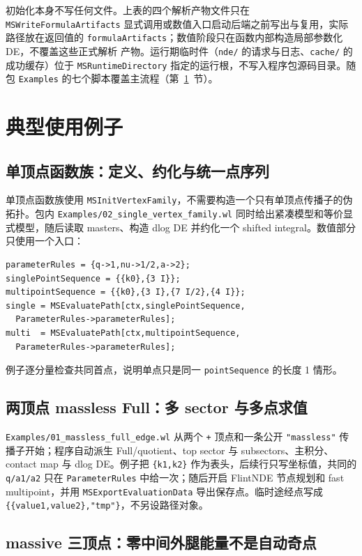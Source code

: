 \documentclass[11pt,a4paper]{ctexart}
\begin{document}
初始化本身不写任何文件。上表的四个解析产物文件只在 \texttt{MSWriteFormulaArtifacts}
显式调用或数值入口启动后端之前写出与复用，实际路径放在返回值的
\texttt{formulaArtifacts}；数值阶段只在函数内部构造局部参数化 DE，不覆盖这些正式解析
产物。运行期临时件（\texttt{nde/} 的请求与日志、\texttt{cache/} 的成功缓存）位于
\texttt{MSRuntimeDirectory} 指定的运行根，不写入程序包源码目录。随包 \texttt{Examples}
的七个脚本覆盖主流程（第~\ref{sec:handbook-examples}~节）。

\section{典型使用例子}
\label{sec:handbook-examples}

\subsection{单顶点函数族：定义、约化与统一点序列}

单顶点函数族使用 \texttt{MSInitVertexFamily}，不需要构造一个只有单顶点传播子的伪拓扑。包内
\texttt{Examples/02\_single\_vertex\_family.wl} 同时给出紧凑模型和等价显式模型，随后读取
masters、构造 dlog DE 并约化一个 shifted integral。数值部分只使用一个入口：
\begin{verbatim}
parameterRules = {q->1,nu->1/2,a->2};
singlePointSequence = {{k0},{3 I}};
multipointSequence = {{k0},{3 I},{7 I/2},{4 I}};
single = MSEvaluatePath[ctx,singlePointSequence,
  ParameterRules->parameterRules];
multi  = MSEvaluatePath[ctx,multipointSequence,
  ParameterRules->parameterRules];
\end{verbatim}
例子逐分量检查共同首点，说明单点只是同一 \texttt{pointSequence} 的长度 1 情形。

\subsection{两顶点 massless Full：多 sector 与多点求值}

\texttt{Examples/01\_massless\_full\_edge.wl} 从两个 \texttt{+} 顶点和一条公开
\texttt{"massless"} 传播子开始；程序自动派生 Full/quotient、top sector 与 subsectors、主积分、contact
map 与 dlog DE。例子把 \texttt{\{k1,k2\}} 作为表头，后续行只写坐标值，共同的
\texttt{q/a1/a2} 只在 \texttt{ParameterRules} 中给一次；随后开启 FlintNDE 节点规划和 fast
multipoint，并用 \texttt{MSExportEvaluationData} 导出保存点。临时途经点写成
\texttt{\{\{value1,value2\},"tmp"\}}，不另设路径对象。

\subsection{massive 三顶点：零中间外腿能量不是自动奇点}
\end{document}
